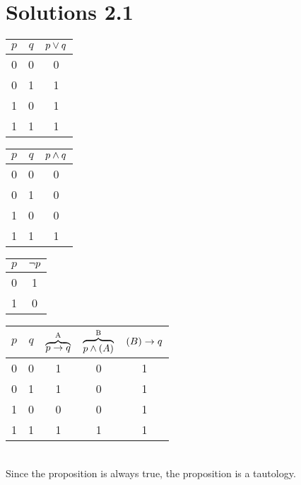 \section*{Solutions 2.1}%

\begin{solutions}
\setcounter{solutioncounter}{0}
\solution
\begin{tabular}{cc | c}
	\toprule
	$p$& $q$& $p \vee q$\\
	\midrule
	\strut
	0& 0& 0\\
	0& 1& 1\\
	1& 0& 1\\
	1& 1& 1\\
	\bottomrule
\end{tabular}
\hfill
\begin{tabular}{cc | c}
	\toprule
	$p$& $q$& $p \wedge q$\\
	\midrule
	\strut
	0& 0& 0\\
	0& 1& 0\\
	1& 0& 0\\
	1& 1& 1\\
	\bottomrule
\end{tabular}
\hfill
\begin{tabular}{c | c}
	\toprule
	$p$& $\lnot p$\\
	\midrule
	\strut
	0& 1\\
	1& 0\\
	\bottomrule
\end{tabular}

\setcounter{solutioncounter}{1}
\solution 
\spart
\begin{tabular}{cc | ccc}
        \toprule
        $p$& $q$& 
        $\overbrace{p\rightarrow q}^\text{A}$ & 
		$\overbrace{p\wedge (A)}^\text{B}$ &
        $(B)\rightarrow q$\\
        \midrule
        \strut 
		0& 0&  1& 0& 1\\
        0& 1&  1& 0& 1\\
        1& 0&  0& 0& 1\\
        1& 1&  1& 1& 1\\
        \bottomrule
     \end{tabular}
 
\hfill\\
Since the proposition is always true, the proposition is a tautology. 


\end{solutions}
